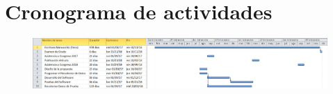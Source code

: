 
\section{Cronograma de actividades}

\begin{figure}[h]
\centering
\includegraphics[width=1.0\columnwidth]{./CapituloI/Imagenes/Cronograma.PNG}
\end{figure}